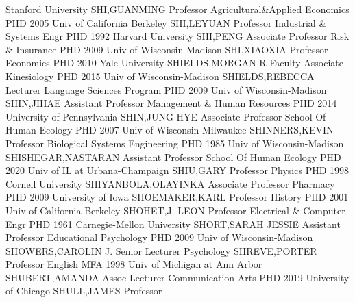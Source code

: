 \documentclass[
]{article}
\begin{document}
Stanford University \textbar SHI,GUANMING \textbar{} 
\textbar Professor \textbar Agricultural\&Applied Economics \textbar PHD
2005 Univ of California Berkeley \textbar SHI,LEYUAN \textbar{}
 \textbar Professor \textbar Industrial \& Systems Engr
\textbar PHD 1992 Harvard University \textbar SHI,PENG \textbar{}
 \textbar Associate Professor \textbar Risk \& Insurance
\textbar PHD 2009 Univ of Wisconsin-Madison \textbar SHI,XIAOXIA
\textbar{}  \textbar Professor \textbar Economics
\textbar PHD 2010 Yale University \textbar SHIELDS,MORGAN R \textbar{}
 \textbar Faculty Associate \textbar Kinesiology
\textbar PHD 2015 Univ of Wisconsin-Madison \textbar SHIELDS,REBECCA
\textbar{}  \textbar Lecturer \textbar Language Sciences
Program \textbar PHD 2009 Univ of Wisconsin-Madison \textbar SHIN,JIHAE
\textbar{}  \textbar Assistant Professor \textbar Management
\& Human Resources \textbar PHD 2014 University of Pennsylvania
\textbar SHIN,JUNG-HYE \textbar{}  \textbar Associate
Professor \textbar School Of Human Ecology \textbar PHD 2007 Univ of
Wisconsin-Milwaukee \textbar SHINNERS,KEVIN \textbar{} 
\textbar Professor \textbar Biological Systems Engineering \textbar PHD
1985 Univ of Wisconsin-Madison \textbar SHISHEGAR,NASTARAN \textbar{}
 \textbar Assistant Professor \textbar School Of Human
Ecology \textbar PHD 2020 Univ of IL at Urbana-Champaign
\textbar SHIU,GARY \textbar{}  \textbar Professor
\textbar Physics \textbar PHD 1998 Cornell University
\textbar SHIYANBOLA,OLAYINKA \textbar{}  \textbar Associate
Professor \textbar Pharmacy \textbar PHD 2009 University of Iowa
\textbar SHOEMAKER,KARL \textbar{}  \textbar Professor
\textbar History \textbar PHD 2001 Univ of California Berkeley
\textbar SHOHET,J. LEON \textbar{}  \textbar Professor
\textbar Electrical \& Computer Engr \textbar PHD 1961 Carnegie-Mellon
University \textbar SHORT,SARAH JESSIE \textbar{} 
\textbar Assistant Professor \textbar Educational Psychology
\textbar PHD 2009 Univ of Wisconsin-Madison \textbar SHOWERS,CAROLIN J.
\textbar{}  \textbar Senior Lecturer \textbar Psychology
\textbar SHREVE,PORTER \textbar Professor \textbar{} 
\textbar English \textbar MFA 1998 Univ of Michigan at Ann Arbor
\textbar SHUBERT,AMANDA \textbar Assoc Lecturer \textbar{} 
\textbar Communication Arts \textbar PHD 2019 University of Chicago
\textbar SHULL,JAMES \textbar Professor \textbar{} 
\end{document}
